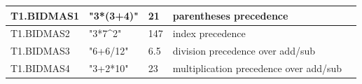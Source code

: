 \documentclass[a4paper, oneside, 11pt]{report}
\begin{document}
\begin{tabular}{|p{1.5in}|p{1.5in}|p{1.6in}|p{1.6in}|p{2.4in}|}
        \hline
        T1.BIDMAS1      & "3*(3+4)"                 & 21                                     & parentheses precedence                  \\
        \hline
        T1.BIDMAS2      & "3*7\^{}2"                & 147                                    & index precedence                        \\
        \hline
        T1.BIDMAS3      & "6+6/12"                  & 6.5                                    & division precedence over add/sub        \\
        \hline
        T1.BIDMAS4      & "3+2*10"                  & 23                                     & multiplication precedence over add/sub  \\
        \hline
    \end{tabular}
\end{document}
